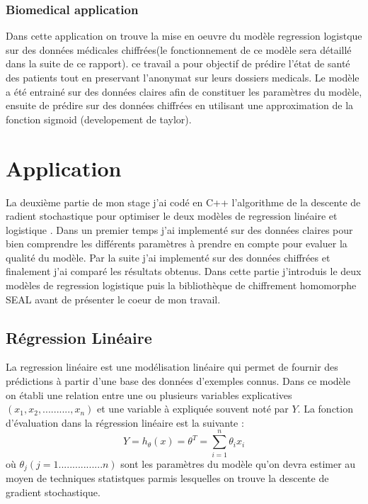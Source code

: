 \documentclass[a4paper,12pt]{article}
\begin{document}
\subsubsection{Biomedical application \cite{deowlin2017manual} } 
Dans cette application on trouve la mise en oeuvre du modèle  regression logistque sur des données médicales  chiffrées(le fonctionnement de ce modèle sera détaillé dans la suite de ce rapport). ce travail a pour objectif de prédire l'état de santé des patients tout en preservant l'anonymat sur leurs dossiers medicals.\newline
Le modèle a été entrainé sur des données claires afin de constituer les paramètres du modèle, ensuite de prédire sur des données chiffrées en utilisant une approximation de la fonction sigmoid (developement de taylor). 

\newpage
\newpage
\section{Application}
La deuxième partie de mon stage j'ai codé en C++ l'algorithme de la descente de radient stochastique pour optimiser le deux modèles de regression linéaire et logistique .\newline
Dans un premier temps j'ai implementé sur des données claires pour bien comprendre les différents paramètres à prendre en compte pour evaluer la qualité du modèle. Par la suite j'ai implementé sur des données chiffrées et finalement j'ai comparé les résultats obtenus. \newline
Dans cette partie j'introduis le deux modèles de regression logistique puis la bibliothèque de chiffrement homomorphe SEAL avant de présenter le coeur de mon travail.\newline       
\subsection {Régression Linéaire}
La regression linéaire est une modélisation linéaire qui permet de fournir des prédictions à partir d'une base des données d'exemples connus.\newline 
Dans ce modèle on établi une relation entre une ou plusieurs variables explicatives $(x_1,x_2,..........,x_n)$ et une variable à expliquée souvent noté par $Y$.\newline
La fonction d'évaluation dans la régression linéaire est la suivante : \newline
$$Y =h_{\theta}(x) = \theta^T = \sum_{i=1}^{n} \theta_ix_i $$\newline
où $\theta_j (j=1................n)$ sont les paramètres du modèle qu'on devra estimer au moyen de techniques statistques parmis  lesquelles on trouve la descente de gradient stochastique.\newline
\end{document}
